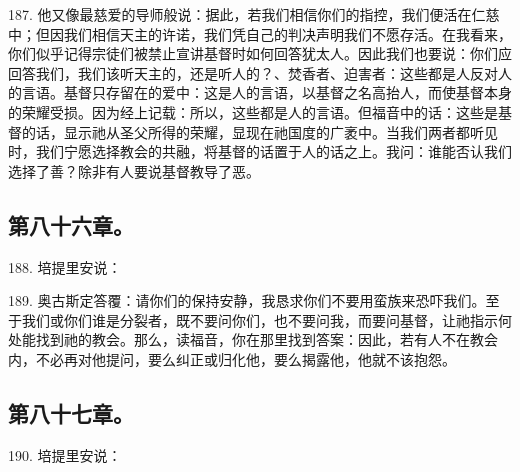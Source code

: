 187. 他又像最慈爱的导师般说：据此，若我们相信你们的指控，我们便活在仁慈中；但因我们相信天主的许诺，我们凭自己的判决声明我们不愿存活。在我看来，你们似乎记得宗徒们被禁止宣讲基督时如何回答犹太人。因此我们也要说：你们应回答我们，我们该听天主的，还是听人的？、焚香者、迫害者：这些都是人反对人的言语。基督只存留在的爱中：这是人的言语，以基督之名高抬人，而使基督本身的荣耀受损。因为经上记载：所以，这些都是人的言语。但福音中的话：这些是基督的话，显示祂从圣父所得的荣耀，显现在祂国度的广袤中。当我们两者都听见时，我们宁愿选择教会的共融，将基督的话置于人的话之上。我问：谁能否认我们选择了善？除非有人要说基督教导了恶。\par


\subsection{第八十六章。}

188. 培提里安说：\par

189. 奥古斯定答覆：请你们的保持安静，我恳求你们不要用蛮族来恐吓我们。至于我们或你们谁是分裂者，既不要问你们，也不要问我，而要问基督，让祂指示何处能找到祂的教会。那么，读福音，你在那里找到答案：因此，若有人不在教会内，不必再对他提问，要么纠正或归化他，要么揭露他，他就不该抱怨。\par


\subsection{第八十七章。}

190. 培提里安说：\par

